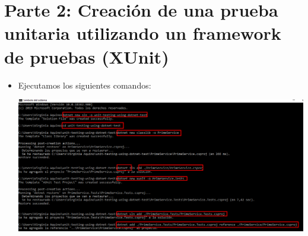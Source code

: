 \section{Parte 2: Creación de una prueba unitaria utilizando un framework de pruebas (XUnit) } 

\begin{itemize}

\item Ejecutamos los siguientes comandos:
\begin{center}
\includegraphics[width=\columnwidth]{images/lab2}\newline
\end{center} 

\end{itemize}
